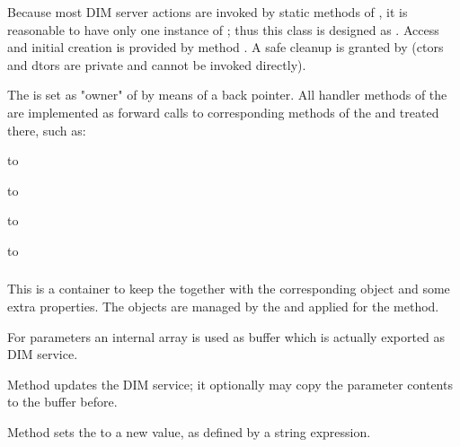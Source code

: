 \begin{compactenum}

\item Because most DIM server actions are invoked by static methods of , it is reasonable to have only one instance of ; 
thus this class is designed as . Access and initial creation is provided by method . A safe cleanup is granted by  (ctors and dtors are private and cannot be invoked directly).

\item The  is set as "owner" of  by means
of a back pointer. All handler methods of the  are
implemented as forward calls to corresponding methods of the 
 and treated there, such as:
\bcir
	\item {} to 
	\item {} to 
	\item {} to 
	\item {} to 
\ecir


    
\end{compactenum}

    
\subsubsection{}
\label{prog_manager_controls_DIM_servicentry}
This is a container to keep the  together with 
the corresponding  object and some extra properties.
The  objects are managed by the
 and applied for the 
  method.


\begin{compactenum} 

\item For  parameters an internal  array is used as buffer which is actually exported as DIM service.

\item Method  updates the DIM service; it optionally may copy the
parameter contents to the buffer before.

\item Method  sets the  to a new value, as defined by a string expression.

\end{compactenum}


